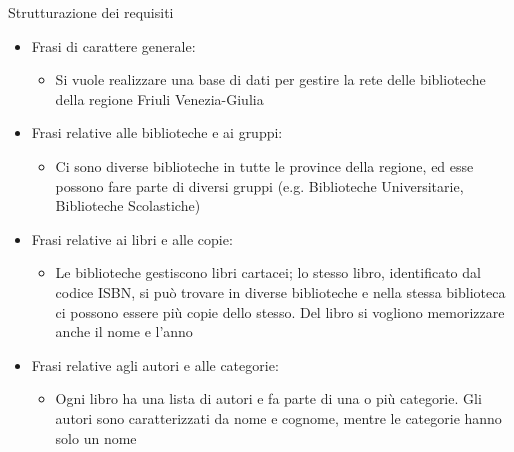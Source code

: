 \begin{frame}{Strutturazione dei requisiti}
    \begin{itemize}
        \item Frasi di carattere generale:
            \begin{itemize}
                \item Si vuole realizzare una base di dati per gestire la rete delle biblioteche della regione Friuli Venezia-Giulia
            \end{itemize}
        \item Frasi relative alle biblioteche e ai gruppi:
            \begin{itemize}
                \item Ci sono diverse biblioteche in tutte le province della regione, ed esse possono fare parte di diversi gruppi (e.g. Biblioteche Universitarie, Biblioteche Scolastiche)
            \end{itemize}
        \item Frasi relative ai libri e alle copie:
            \begin{itemize}
                \item Le biblioteche gestiscono libri cartacei; lo stesso libro, identificato dal codice ISBN, si può trovare in diverse biblioteche e nella stessa biblioteca ci possono essere più copie dello stesso. Del libro si vogliono memorizzare anche il nome e l'anno
            \end{itemize}
        \item Frasi relative agli autori e alle categorie:
            \begin{itemize}
                \item Ogni libro ha una lista di autori e fa parte di una o più categorie. Gli autori sono caratterizzati da nome e cognome, mentre le categorie hanno solo un nome
            \end{itemize}
    \end{itemize}
\end{frame}

